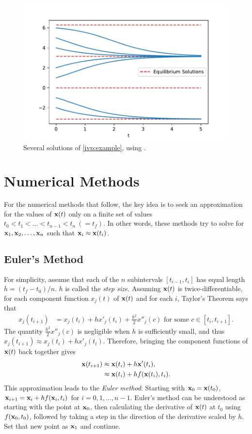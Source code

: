 \begin{figure}
\centering
\includegraphics[width=\textwidth]{example2.pdf}
\caption{Several solutions of \eqref{ivp:example}, using . }
\label{ivp:int_curves}
\end{figure}


\section*{Numerical Methods}
For the numerical methods that follow, the key idea is to seek an approximation for the values of $\mathbf{x}(t)$ only on a finite set of values $t_0 < t_1 < \hdots < t_{n-1} < t_n \ (= t_f)$.
In other words, these methods try to solve for $\mathbf{x}_1,\mathbf{x}_2,\hdots,\mathbf{x}_n$ such that $\mathbf{x}_i \approx \mathbf{x}(t_i)$.

\subsection*{Euler's Method}
For simplicity, assume that each of the $n$ subintervals $[t_{i-1},t_i]$ has equal length $h = (t_f-t_0)/n$. $h$ is called the \textit{step size}.
Assuming $\mathbf{x}(t)$ is twice-differentiable, for each component function $x_j(t)$ of $\mathbf{x}(t)$ and for each $i$, Taylor's Theorem says that
\begin{align*}
x_j(t_{i+1}) &= x_j(t_{i}) + h x'_j(t_i) + \frac{h^2}{2} x''_j(c)\text{ for some } c \in [t_i,t_{i+1}].
\end{align*}
The quantity $\frac{h^2}{2} x''_j(c)$ is negligible when $h$ is sufficiently small, and thus $x_j(t_{i+1}) \approx x_j(t_i) + h x'_j(t_i)$.
Therefore, bringing the component functions of $\mathbf{x}(t)$ back together gives
\begin{align*}
\mathbf{x}(t_{i+1}) &\approx \mathbf{x}(t_i) + h \mathbf{x}'(t_i)  ,\\
&\approx \mathbf{x}(t_{i}) + h f(\mathbf{x}(t_i),t_i).
\end{align*}
This approximation leads to the \textit{Euler method}: Starting with $\mathbf{x}_0 = \mathbf{x}(t_0)$, $\mathbf{x}_{i+1} = \mathbf{x}_i +hf(\mathbf{x}_i,t_i)$ for $i = 0, 1, \hdots, n-1$.
Euler's method can be understood as starting with the point at $\mathbf{x}_0$, then calculating the derivative of $\mathbf{x}(t)$ at $t_0$ using $f(\mathbf{x}_0,t_0)$, followed by taking a step in the direction of the derivative scaled by $h$. Set that new point as $\mathbf{x}_1$ and continue.

